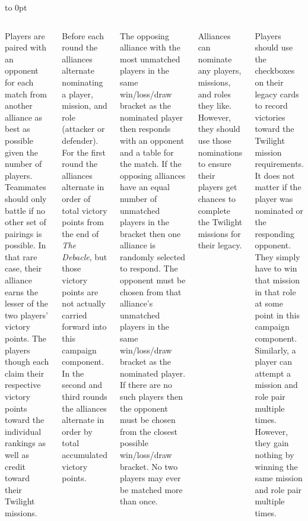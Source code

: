 \vbox to 0pt{}

\clearpage

\begin{columns}


Players are paired with an opponent for each match from another
alliance as best as possible given the number of players.  Teammates
should only battle if no other set of pairings is possible.  In that
rare case, their alliance earns the lesser of the two players' victory
points.  The players though each claim their respective victory points
toward the individual rankings as well as credit toward their Twilight
missions.

Before each round the alliances alternate nominating a player,
mission, and role (attacker or defender).  For the first round the
alliances alternate in order of total victory points from the end of
\emph{The Debacle}, but those victory points are not actually carried
forward into this campaign component.  In the second and third rounds
the alliances alternate in order by total accumulated victory points.

The opposing alliance with the most unmatched players in the same
win/loss/draw bracket as the nominated player then responds with an
opponent and a table for the match.  If the opposing alliances have an
equal number of unmatched players in the bracket then one alliance is
randomly selected to respond.  The opponent must be chosen from that
alliance's unmatched players in the same win/loss/draw bracket as the
nominated player.  If there are no such players then the opponent must
be chosen from the closest possible win/loss/draw bracket.  No two
players may ever be matched more than once.

Alliances can nominate any players, missions, and roles they like.
However, they should use those nominations to ensure their players get
chances to complete the Twilight missions for their legacy.

Players should use the checkboxes on their legacy cards to record
victories toward the Twilight mission requirements.  It does not
matter if the player was nominated or the responding opponent.  They
simply have to win that mission in that role at some point in this
campaign component.  Similarly, a player can attempt a mission and
role pair multiple times.  However, they gain nothing by winning the
same mission and role pair multiple times.

\end{columns}

